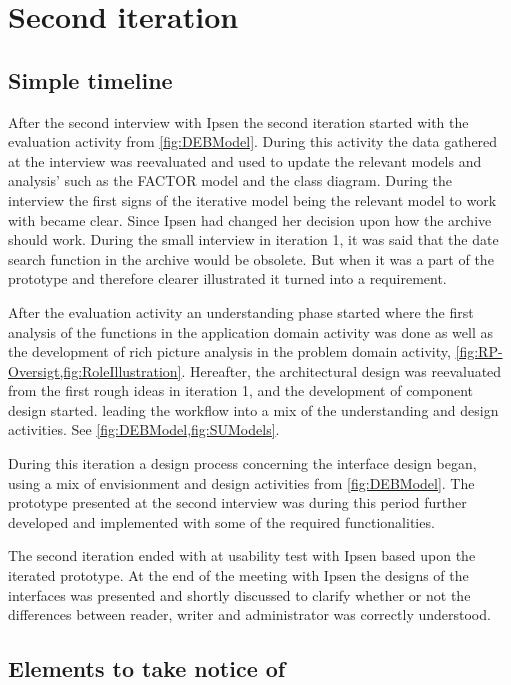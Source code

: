 \section{Second iteration}
\subsection{Simple timeline}\label{sec:2Iteration-timeline}
After the second interview with Ipsen the second iteration started with the evaluation activity from \cref{fig:DEBModel}. 
During this activity the data gathered at the interview was reevaluated and used to update the relevant models and analysis' such as the FACTOR model and the class diagram.
During the interview the first signs of the iterative model being the relevant model to work with became clear.
Since Ipsen had changed her decision upon how the archive should work.
 During the small interview in iteration 1, it was said that the date search function in the archive would be obsolete.
But when it was a part of the prototype and therefore clearer illustrated it turned into a requirement.

After the evaluation activity an understanding phase started where the first analysis of the functions in the application domain activity was done as well as the development of rich picture analysis in the problem domain activity, \cref{fig:RP-Oversigt,fig:RoleIllustration}.
Hereafter, the architectural design was reevaluated from the first rough ideas in iteration 1, and the development of component design started.
leading the workflow into a mix of the understanding and design activities. 
See \cref{fig:DEBModel,fig:SUModels}.

During this iteration a design process concerning the interface design began, using a mix of envisionment and design activities from \cref{fig:DEBModel}.
The prototype presented at the second interview was during this period further developed and implemented with some of the required functionalities.

The second iteration ended with at usability test with Ipsen based upon the iterated prototype. 
At the end of the meeting with Ipsen the designs of the interfaces was presented and shortly discussed to clarify whether or not the differences between reader, writer and administrator was correctly understood.

\subsection{Elements to take notice of}
